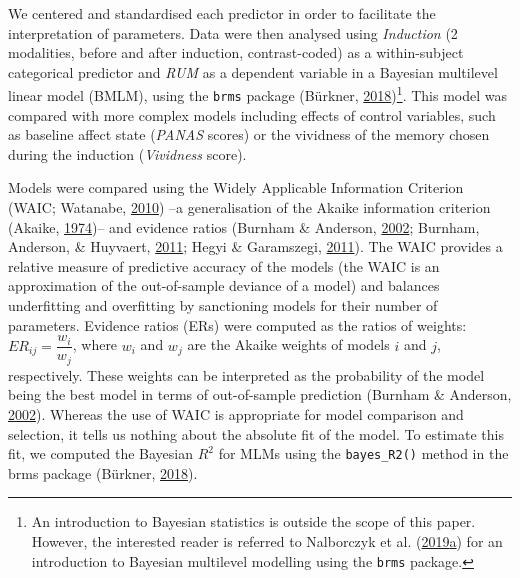 \documentclass[a4paper,12pt,twoside,openright,oldfontcommands,final]{memoir}
\let\rmarkdownfootnote\footnote%
\def\footnote{\protect\rmarkdownfootnote}
\begin{document}
We centered and standardised each predictor in order to facilitate the interpretation of parameters. Data were then analysed using \emph{Induction} (2 modalities, before and after induction, contrast-coded) as a within-subject categorical predictor and \emph{RUM} as a dependent variable in a Bayesian multilevel linear model (BMLM), using the \texttt{brms} package (Bürkner, \protect\hyperlink{ref-R-brms}{2018})\footnote{An introduction to Bayesian statistics is outside the scope of this paper. However, the interested reader is referred to Nalborczyk et al. (\protect\hyperlink{ref-nalborczyk_introduction_2019}{2019}\protect\hyperlink{ref-nalborczyk_introduction_2019}{a}) for an introduction to Bayesian multilevel modelling using the \texttt{brms} package.}. This model was compared with more complex models including effects of control variables, such as baseline affect state (\emph{PANAS} scores) or the vividness of the memory chosen during the induction (\emph{Vividness} score).

Models were compared using the Widely Applicable Information Criterion (WAIC; Watanabe, \protect\hyperlink{ref-watanabe_asymptotic_2010}{2010}) --a generalisation of the Akaike information criterion (Akaike, \protect\hyperlink{ref-akaike_new_1974}{1974})-- and evidence ratios (Burnham \& Anderson, \protect\hyperlink{ref-burnham_model_2002}{2002}; Burnham, Anderson, \& Huyvaert, \protect\hyperlink{ref-burnham_aic_2011}{2011}; Hegyi \& Garamszegi, \protect\hyperlink{ref-hegyi_using_2011}{2011}). The WAIC provides a relative measure of predictive accuracy of the models (the WAIC is an approximation of the out-of-sample deviance of a model) and balances underfitting and overfitting by sanctioning models for their number of parameters. Evidence ratios (ERs) were computed as the ratios of weights: \(ER_{ij} = \dfrac{w_{i}}{w_{j}}\), where \(w_{i}\) and \(w_{j}\) are the Akaike weights of models \(i\) and \(j\), respectively. These weights can be interpreted as the probability of the model being the best model in terms of out-of-sample prediction (Burnham \& Anderson, \protect\hyperlink{ref-burnham_model_2002}{2002}). Whereas the use of WAIC is appropriate for model comparison and selection, it tells us nothing about the absolute fit of the model. To estimate this fit, we computed the Bayesian \(R^2\) for MLMs using the \texttt{bayes\_R2()} method in the brms package (Bürkner, \protect\hyperlink{ref-R-brms}{2018}).
\end{document}
